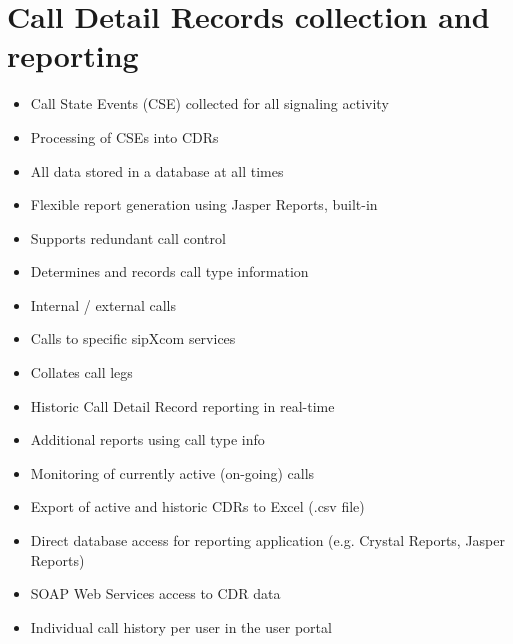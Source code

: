 \documentclass[letterpaper,10pt,english]{sphinxmanual}
\begin{document}
\section{Call Detail Records collection and reporting}
\label{\detokenize{features:call-detail-records-collection-and-reporting}}\begin{itemize}
\item {} 
Call State Events (CSE) collected for all signaling activity

\item {} 
Processing of CSEs into CDRs

\item {} 
All data stored in a database at all times

\item {} 
Flexible report generation using Jasper Reports, built-in

\item {} 
Supports redundant call control

\item {} 
Determines and records call type information

\item {} 
Internal / external calls

\item {} 
Calls to specific sipXcom services

\item {} 
Collates call legs

\item {} 
Historic Call Detail Record reporting in real-time

\item {} 
Additional reports using call type info

\item {} 
Monitoring of currently active (on-going) calls

\item {} 
Export of active and historic CDRs to Excel (.csv file)

\item {} 
Direct database access for reporting application (e.g. Crystal Reports, Jasper Reports)

\item {} 
SOAP Web Services access to CDR data

\item {} 
Individual call history per user in the user portal

\end{itemize}
\end{document}
